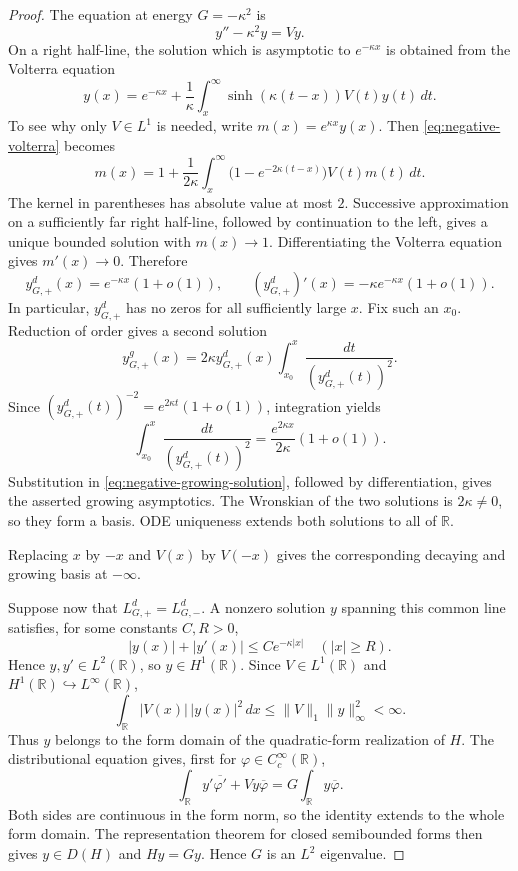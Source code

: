 \documentclass[11pt]{amsart}
\numberwithin{equation}{section}
\theoremstyle{remark}
\newcommand{\R}{\mathbb R}
\begin{document}
\begin{proof}
The equation at energy $G=-\kappa^2$ is
\[
 y''-\kappa^2y=Vy.
\]
On a right half-line, the solution which is asymptotic to $e^{-\kappa x}$ is
obtained from the Volterra equation
\begin{equation}
 y(x)=e^{-\kappa x}
 +\frac1\kappa\int_x^\infty
   \sinh(\kappa(t-x))V(t)y(t)\,dt.
 \label{eq:negative-volterra}
\end{equation}
To see why only $V\in L^1$ is needed, write $m(x)=e^{\kappa x}y(x)$.  Then
\eqref{eq:negative-volterra} becomes
\[
 m(x)=1+\frac1{2\kappa}\int_x^\infty
 \bigl(1-e^{-2\kappa(t-x)}\bigr)V(t)m(t)\,dt.
\]
The kernel in parentheses has absolute value at most $2$.  Successive
approximation on a sufficiently far right half-line, followed by continuation
to the left, gives a unique bounded solution with $m(x)\to1$.  Differentiating
the Volterra equation gives $m'(x)\to0$.  Therefore
\[
 y^d_{G,+}(x)=e^{-\kappa x}(1+o(1)),
 \qquad
 (y^d_{G,+})'(x)=-\kappa e^{-\kappa x}(1+o(1)).
\]
In particular, $y^d_{G,+}$ has no zeros for all sufficiently large $x$.
Fix such an $x_0$.  Reduction of order gives a second solution
\begin{equation}
 y^g_{G,+}(x)
 =2\kappa y^d_{G,+}(x)
   \int_{x_0}^{x}\frac{dt}{(y^d_{G,+}(t))^2}.
 \label{eq:negative-growing-solution}
\end{equation}
Since $(y^d_{G,+}(t))^{-2}=e^{2\kappa t}(1+o(1))$, integration yields
\[
 \int_{x_0}^{x}\frac{dt}{(y^d_{G,+}(t))^2}
 =\frac{e^{2\kappa x}}{2\kappa}(1+o(1)).
\]
Substitution in \eqref{eq:negative-growing-solution}, followed by
differentiation, gives the asserted growing asymptotics.  The Wronskian of
the two solutions is $2\kappa\ne0$, so they form a basis.  ODE uniqueness
extends both solutions to all of $\R$.

Replacing $x$ by $-x$ and $V(x)$ by $V(-x)$ gives the corresponding decaying
and growing basis at $-\infty$.

Suppose now that $L^d_{G,+}=L^d_{G,-}$.  A nonzero solution $y$ spanning this
common line satisfies, for some constants $C,R>0$,
\[
 |y(x)|+|y'(x)|\le Ce^{-\kappa|x|}
 \quad (|x|\ge R).
\]
Hence $y,y'\in L^2(\R)$, so $y\in H^1(\R)$.  Since
$V\in L^1(\R)$ and $H^1(\R)\hookrightarrow L^\infty(\R)$,
\[
 \int_\R |V(x)|\,|y(x)|^2\,dx
 \le \|V\|_1\|y\|_\infty^2<\infty.
\]
Thus $y$ belongs to the form domain of the quadratic-form realization of
$H$.  The distributional equation gives, first for
$\varphi\in C_c^\infty(\R)$,
\[
 \int_\R y'\overline{\varphi'}+Vy\overline\varphi
 =G\int_\R y\overline\varphi.
\]
Both sides are continuous in the form norm, so the identity extends to the
whole form domain.  The representation theorem for closed semibounded forms
then gives $y\in D(H)$ and $Hy=Gy$.  Hence $G$ is an $L^2$ eigenvalue.
\end{proof}
\end{document}
